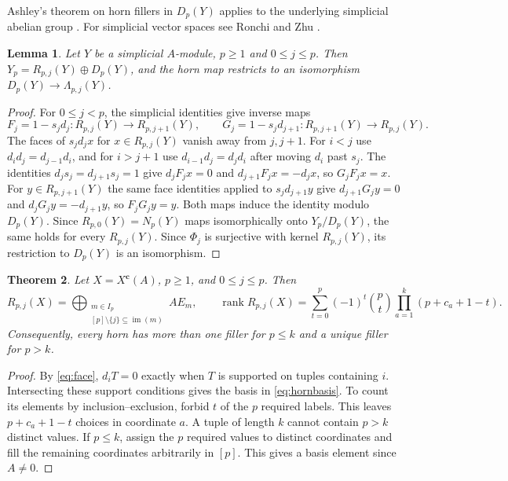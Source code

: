 \documentclass[11pt]{article}
\newtheorem{theorem}{Theorem}[section]
\newtheorem{lemma}[theorem]{Lemma}
\theoremstyle{definition}
\theoremstyle{remark}
\DeclareMathOperator{\im}{im}
\DeclareMathOperator{\rank}{rank}
\begin{document}
Ashley's theorem on horn fillers in $D_p(Y)$ applies to the underlying
simplicial abelian group \cite[Ch.~3, Theorem~1.5]{Ashley1978}.
For simplicial vector spaces see Ronchi and Zhu \cite[Lemma~2.10]{RonchiZhu}.

\begin{lemma}\label{lem:hornsplit}
Let $Y$ be a simplicial $A$-module, $p\geq1$ and $0\leq j\leq p$.
Then $Y_p=R_{p,j}(Y)\oplus D_p(Y)$, and the horn map restricts to an
isomorphism $D_p(Y)\to\Lambda_{p,j}(Y)$.
\end{lemma}
\begin{proof}
For $0\leq j<p$, the simplicial identities give inverse maps
\[
 F_j=1-s_jd_j:R_{p,j}(Y)\longrightarrow R_{p,j+1}(Y),\qquad
 G_j=1-s_jd_{j+1}:R_{p,j+1}(Y)\longrightarrow R_{p,j}(Y).
\]
The faces of $s_jd_jx$ for $x\in R_{p,j}(Y)$ vanish away
from $j,j+1$. For $i<j$ use $d_id_j=d_{j-1}d_i$, and for
$i>j+1$ use $d_{i-1}d_j=d_jd_i$ after moving $d_i$ past $s_j$.
The identities $d_js_j=d_{j+1}s_j=1$ give $d_jF_jx=0$ and
$d_{j+1}F_jx=-d_jx$, so $G_jF_jx=x$. For $y\in R_{p,j+1}(Y)$ the
same face identities applied to $s_jd_{j+1}y$ give
$d_{j+1}G_jy=0$ and $d_jG_jy=-d_{j+1}y$, so $F_jG_jy=y$.
Both maps induce the identity modulo $D_p(Y)$. Since
$R_{p,0}(Y)=N_p(Y)$ maps isomorphically onto $Y_p/D_p(Y)$,
the same holds for every $R_{p,j}(Y)$. Since $\Phi_j$ is surjective with
kernel $R_{p,j}(Y)$, its restriction to $D_p(Y)$ is an isomorphism.
\end{proof}

\begin{theorem}\label{thm:hornbasis}
Let $X=X^{\mathbf c}(A)$, $p\geq1$, and $0\leq j\leq p$. Then
\begin{equation}\label{eq:hornbasis}
 R_{p,j}(X)=\bigoplus_{\substack{m\in I_p\\{}[p]\setminus\{j\}\subseteq\im(m)}} AE_m,
 \qquad
 \rank R_{p,j}(X)=
 \sum_{t=0}^p(-1)^t\binom pt\prod_{a=1}^k(p+c_a+1-t).
\end{equation}
Consequently, every horn has more than one filler for $p\leq k$ and a
unique filler for $p>k$.
\end{theorem}
\begin{proof}
By \eqref{eq:face}, $d_iT=0$ exactly when $T$ is supported on
tuples containing $i$. Intersecting these support conditions gives
the basis in \eqref{eq:hornbasis}. To count its elements by
inclusion--exclusion, forbid $t$ of the $p$ required labels.
This leaves $p+c_a+1-t$ choices in coordinate $a$.
A tuple of length $k$ cannot contain $p>k$ distinct values. If
$p\leq k$, assign the $p$ required values to distinct coordinates
and fill the remaining coordinates arbitrarily in $[p]$.
This gives a basis element since $A\ne0$.
\end{proof}
\end{document}
